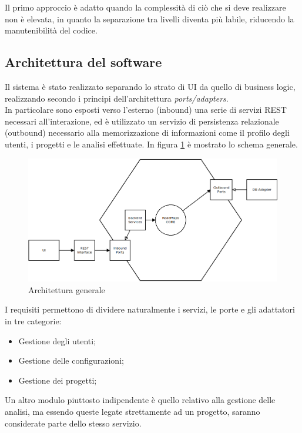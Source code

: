 Il primo approccio è adatto quando la complessità di ciò che si deve realizzare non è elevata, in quanto la separazione tra livelli diventa più labile, riducendo la manutenibilità del codice.



\subsection{Architettura del software}
Il sistema è stato realizzato separando lo strato di UI da quello di business logic, realizzando secondo i principi dell'architettura \textit{ports/adapters}.\\
In particolare sono esposti verso l'esterno (inbound) una serie di servizi REST necessari all'interazione, ed è utilizzato un servizio di persistenza relazionale (outbound) necessario alla memorizzazione di informazioni come il profilo degli utenti, i progetti e le analisi effettuate.
In figura \ref{fig:architecture00} è mostrato lo schema generale.

\begin{figure}[h]
	\centering
	\includegraphics[width=\textwidth]{img/architecture00}
	\caption{Architettura generale}
	\label{fig:architecture00}
\end{figure}

I requisiti permettono di dividere naturalmente i servizi, le porte e gli adattatori in tre categorie:
\begin{itemize}
	\item Gestione degli utenti;
	\item Gestione delle configurazioni;
	\item Gestione dei progetti;
\end{itemize}

Un altro modulo piuttosto indipendente è quello relativo alla gestione delle analisi, ma essendo queste legate strettamente ad un progetto, saranno considerate parte dello stesso servizio.

